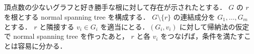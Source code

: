 \subsection{}
頂点数の少ないグラフと好き勝手な根に対して存在が示されたとする．
$G$ の $r$ を根とする normal spanning tree を構成する．
$G\setminus \{r\}$ の連結成分を $G_1, \ldots, G_m$ とする．
$r$ と隣接する $v_i \in G_i$ を適当にとる．$(G_i, v_i)$ に対して帰納法の仮定で normal spanning tree を作ったあと，
$r$ と各 $v_i$ をつなげば，条件を満たすことは容易に分かる．